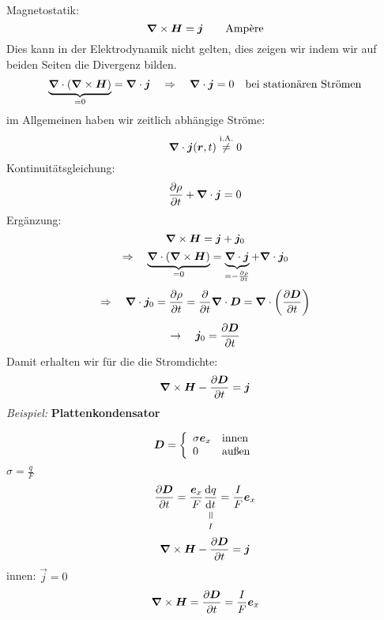Magnetostatik:
\begin{equation*}
\bm{\nabla} \times \bm{H} = \bm{j} \qquad \textrm{Amp\`ere}
\end{equation*}
Dies kann in der Elektrodynamik nicht gelten, dies zeigen wir indem wir auf beiden Seiten die Divergenz bilden.
\begin{equation*}
\underbrace{\bm{\nabla} \cdot (\bm{\nabla} \times \bm{H})}_{=0} = \bm{\nabla} \cdot \bm{j} \quad \Rightarrow \quad \bm{\nabla} \cdot \bm{j} = 0 \quad \textrm{bei stationären Strömen}
\end{equation*}
im Allgemeinen haben wir zeitlich abhängige Ströme:
\begin{equation*}
\bm{\nabla} \cdot \bm{j}(\bm{r},t) \overset{\textrm{i.A.}}{\neq} 0
\end{equation*}
Kontinuitätsgleichung:
\begin{equation*}
\frac{\partial \rho}{\partial t} + \bm{\nabla} \cdot \bm{j} = 0
\end{equation*}
Ergänzung:
\begin{equation*}
\bm{\nabla} \times \bm{H} = \bm{j} + \bm{j}_0
\end{equation*}
\begin{equation*}
\Rightarrow \quad \underbrace{\bm{\nabla} \cdot (\bm{\nabla} \times \bm{H})}_{= 0} = \underbrace{\bm{\nabla} \cdot \bm{j}}_{= - \frac{\partial \rho}{\partial t}} + \bm{\nabla} \cdot \bm{j}_0
\end{equation*}
\begin{equation*}
\Rightarrow \quad \bm{\nabla} \cdot \bm{j}_0 = \frac{\partial \rho}{\partial t} = \frac{\partial }{\partial t} \bm{\nabla} \cdot \bm{D} = \bm{\nabla} \cdot \left(\frac{\partial \bm{D}}{\partial t}\right)
\end{equation*}
\begin{equation*}
\rightarrow \quad \bm{j}_0 = \frac{\partial \bm{D}}{\partial t}
\end{equation*}
Damit erhalten wir für die die Stromdichte:
\begin{equation*}
\bm{\nabla} \times \bm{H} - \frac{\partial \bm{D}}{\partial t} = \bm{j}
\end{equation*}
\emph{Beispiel:} \textbf{Plattenkondensator}\\
\begin{minipage}{.6\linewidth}
	\begin{equation*}
	\bm{D} = \left\{ \begin{array}{ll} {\sigma \bm{e}_x} & {\textrm{innen}} \\ {0} & {\textrm{außen}} \end{array} \right.
	\end{equation*}
	$ \sigma = \frac{q}{F} $
	\begin{equation*}
	\prt{\vec{D}}{t} = \frac{\vec{e}_x}{F} \equalto{\prd{q}{t}}{I} = \frac{I}{F} \vec{e}_x
	\end{equation*}
	\begin{equation*}
	\bm{\nabla} \times \bm{H} - \frac{\partial \bm{D}}{\partial t} = \bm{j}
	\end{equation*}
	innen: $ \vec{j} = 0 $
	\begin{equation*}
	\bm{\nabla} \times \bm{H} = \frac{\partial \bm{D}}{\partial t} =  \frac{I}{F} \bm{e}_x
	\end{equation*}
\end{minipage}%
